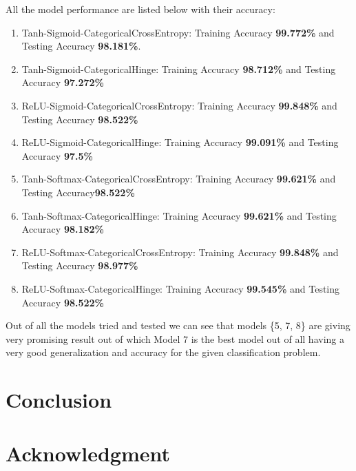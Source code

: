 \documentclass[conference]{IEEEtran}
\begin{document}
All the model performance are listed below with their accuracy:

\begin{enumerate}
    \item Tanh-Sigmoid-CategoricalCrossEntropy: Training Accuracy \textbf{99.772\%} and Testing Accuracy \textbf{98.181\%}.

    \item Tanh-Sigmoid-CategoricalHinge: Training Accuracy \textbf{98.712\%} and Testing Accuracy \textbf{97.272\%}

    \item ReLU-Sigmoid-CategoricalCrossEntropy: Training Accuracy \textbf{99.848\%} and Testing Accuracy \textbf{98.522\%}

    \item ReLU-Sigmoid-CategoricalHinge: Training Accuracy \textbf{99.091\%} and Testing Accuracy \textbf{97.5\%}

    \item Tanh-Softmax-CategoricalCrossEntropy: Training Accuracy \textbf{99.621\%} and Testing Accuracy\textbf{98.522\%}

    \item Tanh-Softmax-CategoricalHinge: Training Accuracy \textbf{99.621\%} and Testing Accuracy \textbf{98.182\%}

    \item ReLU-Softmax-CategoricalCrossEntropy: Training Accuracy \textbf{99.848\%} and Testing Accuracy \textbf{98.977\%}

    \item ReLU-Softmax-CategoricalHinge: Training Accuracy \textbf{99.545\%} and Testing Accuracy \textbf{98.522\%}

\end{enumerate}

Out of all the models tried and tested we can see that models \{5, 7, 8\} are giving very promising result out of which Model 7 is the best model out of all having a very good generalization and accuracy for the given classification problem.

\section{Conclusion}

\section*{Acknowledgment}
\end{document}
